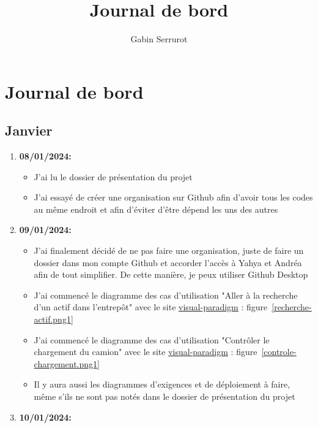 \documentclass[10pt,a4paper]{book}
\title{Journal de bord}
\author{Gabin Serrurot}
\begin{document}
\maketitle

\tableofcontents

\part{Journal de bord}

\chapter{Janvier}

\begin{enumerate}
    \item \textbf{08/01/2024:}
        \begin{itemize}
            \item J'ai lu le dossier de présentation du projet
            \item J'ai essayé de créer une organisation sur Github afin d'avoir tous les codes au même endroit et afin d'éviter d'être dépend les uns des autres
        \end{itemize}
    \item \textbf{09/01/2024:}
        \begin{itemize}
            \item J'ai finalement décidé de ne pas faire une organisation, juste de faire un dossier dans mon compte Github et accorder l'accès à Yahya et Andréa afin de tout simplifier. De cette manière, je peux utiliser Github Desktop
            \item J'ai commencé le diagramme des cas d'utilisation "Aller à la recherche d’un actif dans l’entrepôt" avec le site \href{https://online.visual-paradigm.com}{visual-paradigm} : figure~\ref{recherche-actif.png1}
            \item J'ai commencé le diagramme des cas d'utilisation "Contrôler le chargement du camion" avec le site \href{https://online.visual-paradigm.com}{visual-paradigm} : figure~\ref{controle-chargement.png1}
            \item Il y aura aussi les diagrammes d'exigences et de déploiement à faire, même s'ils ne sont pas notés dans le dossier de présentation du projet
        \end{itemize}
    \item \textbf{10/01/2024:}
        \begin{itemize}

\end{itemize}
\end{enumerate}
\end{document}
